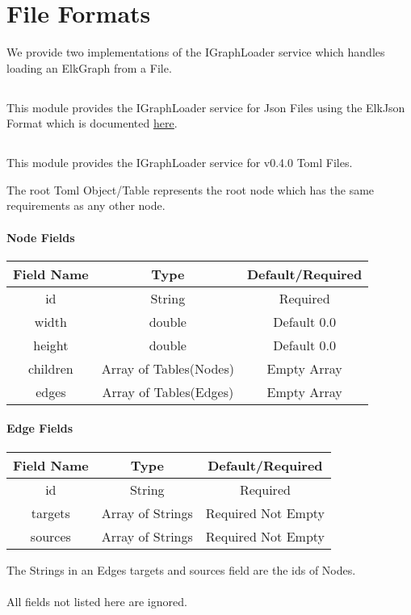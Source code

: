 \section{File Formats}

We provide two implementations of the IGraphLoader service
which handles loading an ElkGraph from a File.

\subsection{}

This module provides the IGraphLoader service for Json Files using the ElkJson Format which is documented \underline{\href{https://www.eclipse.org/elk/documentation/tooldevelopers/graphdatastructure/jsonformat.html}{here}}.

\subsection{}

This module provides the IGraphLoader service for v0.4.0 Toml Files.

The root Toml Object/Table represents the root node which
has the same requirements as any other node.

\paragraph{Node Fields}
\begin{tabular}{|c|c|c|}
\hline 
Field Name & Type & Default/Required \\ 
\hline 
id & String & Required \\ 
\hline 
width & double & Default 0.0 \\ 
\hline 
height & double & Default 0.0 \\ 
\hline 
children & Array of Tables(Nodes) & Empty Array \\ 
\hline 
edges & Array of Tables(Edges) & Empty Array \\ 
\hline 
\end{tabular} 

\paragraph{Edge Fields}
\begin{tabular}{|c|c|c|}
\hline 
Field Name & Type & Default/Required \\ 
\hline 
id & String & Required \\ 
\hline 
targets & Array of Strings & Required Not Empty \\ 
\hline 
sources & Array of Strings & Required Not Empty \\ 
\hline 
\end{tabular} 

The Strings in an Edges targets and sources field are the ids of Nodes.

\paragraph{}
All fields not listed here are ignored.